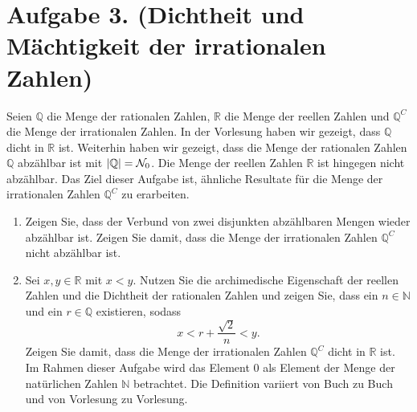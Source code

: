 \documentclass[german,12pt]{homework}
\newcommand{\NN}{\mathbb{N}}
\newcommand{\QQ}{\mathbb{Q}}
\newcommand{\RR}{\mathbb{R}}
\DeclarePairedDelimiter{\absolute}{\lvert}{\rvert}
\begin{document}
    \section*{Aufgabe 3. (Dichtheit und Mächtigkeit der irrationalen Zahlen)}

    \begin{problem}
        Seien \(\QQ\) die Menge der rationalen Zahlen, \(\RR\) die Menge der reellen Zahlen und \(\QQ^C\) die Menge der irrationalen Zahlen. In der Vorlesung haben wir gezeigt, dass \(\QQ\) dicht in \(\RR\) ist. Weiterhin haben wir gezeigt, dass die Menge der rationalen Zahlen \(\QQ\) abzählbar ist mit \(\absolute*{\QQ} = \mathcal{N}_0\). Die Menge der reellen Zahlen \(\RR\) ist hingegen nicht abzählbar. Das Ziel dieser Aufgabe ist, ähnliche Resultate für die Menge der irrationalen Zahlen \(\mathbb{Q}^C\) zu erarbeiten.
        \begin{enumerate}
            \item Zeigen Sie, dass der Verbund von zwei disjunkten abzählbaren Mengen wieder abzählbar ist. Zeigen Sie damit, dass die Menge der irrationalen Zahlen \(\QQ^C\) nicht abzählbar ist.
            \item Sei \(x, y \in \RR\) mit \(x < y\). Nutzen Sie die archimedische Eigenschaft der reellen Zahlen und die Dichtheit der rationalen Zahlen und zeigen Sie, dass ein \(n \in \NN\) und ein \(r \in \QQ\) existieren, sodass
            \[x < r + \frac{\sqrt{2}}{n} < y.\]
            Zeigen Sie damit, dass die Menge der irrationalen Zahlen \(\QQ^C\) dicht in \(\RR\) ist. Im Rahmen dieser Aufgabe wird das Element \(0\) als Element der Menge der natürlichen Zahlen \(\NN\) betrachtet. Die Definition variiert von Buch zu Buch und von Vorlesung zu Vorlesung.
        \end{enumerate}
    \end{problem}
\end{document}
